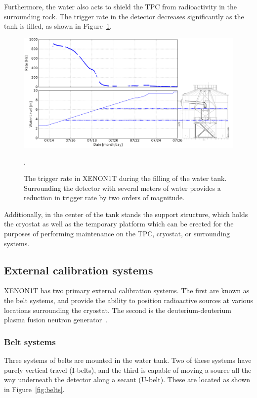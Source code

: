 Furthermore, the water also acts to shield the TPC from radioactivity in the surrounding rock. The trigger rate in the detector decreases significantly as the tank is filled, as shown in Figure~\ref{fig:waterlevel}.

\begin{figure}[htb]
    \includegraphics[width=\textwidth]{figures/xe1t/water_level_part_2}
    \caption{The trigger rate in XENON1T during the filling of the water tank. Surrounding the detector with several meters of water provides a reduction in trigger rate by two orders of magnitude.}\label{fig:waterlevel}.
\end{figure}

Additionally, in the center of the tank stands the support structure, which holds the cryostat as well as the temporary platform which can be erected for the purposes of performing maintenance on the TPC, cryostat, or surrounding systems.

\subsection{External calibration systems}

XENON1T has two primary external calibration systems. The first are known as the belt systems, and provide the ability to position radioactive sources at various locations surrounding the cryostat. The second is the deuterium-deuterium plasma fusion neutron generator~\cite{Lang:2017ymt}.

\subsubsection{Belt systems}

Three systems of belts are mounted in the water tank. Two of these systems have purely vertical travel (I-belts), and the third is capable of moving a source all the way underneath the detector along a secant (U-belt). These are located as shown in Figure~\ref{fig:belts}.


